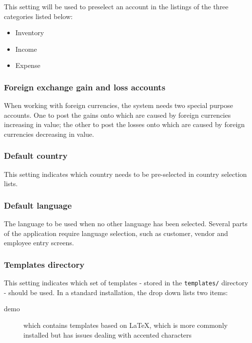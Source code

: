 This setting will be used to preselect an account in
the listings of the three categories listed below:
\begin{itemize}
\item Inventory
\item Income
\item Expense
\end{itemize}


\subsubsection{Foreign exchange gain and loss accounts}
\label{subsubsec-company-config-defaults-fx-accounts}

When working with foreign currencies,
the system needs two special purpose accounts. One to post the gains onto which are
caused by foreign currencies increasing in value; the other to post the losses onto
which are caused by foreign currencies decreasing in value.


\subsubsection{Default country}
\label{subsubsec-company-config-defaults-country}

This setting indicates which country needs to be pre-selected
   in country selection lists.


\subsubsection{Default language}
\label{subsubsec-company-config-defaults-language}

The language to be used when no other language has been selected. Several parts of the
application require language selection, such as customer, vendor and employee entry screens.

\subsubsection{Templates directory}
\label{subsubsec-company-config-defaults-templates}

This setting indicates which set of templates - stored in the
   \texttt{templates/} directory - should be used. In a standard installation, the drop down
   lists two items:
\begin{description}
   \item [demo] which contains templates based on \LaTeX, which is more commonly installed but has issues dealing with accented characters
   \end{description}


